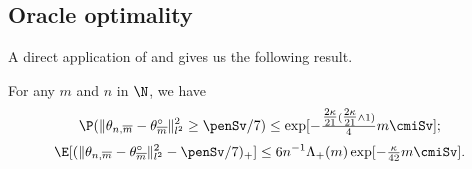 \subsection{Oracle optimality}\label{FREQ_GAUSS_ORACLE}

A direct application of  and  gives us the following result.
\begin{cor*}
For any $m$ and $n$ in $\N$, we have
\[\P(\Vert \theta_{n, \overline{m}} - \theta^{\circ}_{\overline{m}} \Vert_{l^{2}}^{2} \geq \penSv / 7) \leq \exp[- \tfrac{\tfrac{2 \kappa}{21} (\tfrac{2 \kappa}{21} \wedge 1)}{4} m \cmiSv];\]
\[\E[(\Vert \theta_{n, \overline{m}} - \theta^{\circ}_{\overline{m}} \Vert_{l^{2}}^{2} - \penSv / 7 )_{+}] \leq 6 n^{-1}\Lambda_{+}(m) \exp[- \tfrac{\kappa}{42} m \cmiSv].\]
\reEnd
\end{cor*}



\begin{thm}\label{THM_FREQ_IGSSM_KNOWN_IID_ORACLE_NP}
\reEnd
\end{thm}

